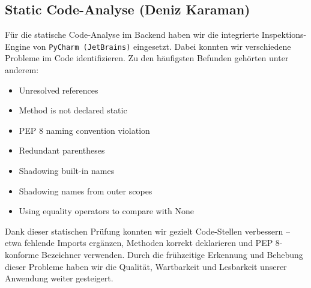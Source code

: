 \documentclass{article}
\begin{document}
\subsection{Static Code-Analyse (Deniz Karaman)}
Für die statische Code‐Analyse im Backend haben wir die integrierte Inspektions-Engine von \texttt{PyCharm (JetBrains)} eingesetzt. Dabei konnten wir verschiedene Probleme im Code identifizieren. Zu den häufigsten Befunden gehörten unter anderem:

\begin{itemize}
  \item Unresolved references
  \item Method is not declared static
  \item PEP 8 naming convention violation 
  \item Redundant parentheses
  \item Shadowing built-in names
  \item Shadowing names from outer scopes
  \item Using equality operators to compare with None
\end{itemize}

Dank dieser statischen Prüfung konnten wir gezielt Code-Stellen verbessern – etwa fehlende Imports ergänzen, Methoden korrekt deklarieren und PEP 8-konforme Bezeichner verwenden. Durch die frühzeitige Erkennung und Behebung dieser Probleme haben wir die Qualität, Wartbarkeit und Lesbarkeit unserer Anwendung weiter gesteigert.

\newpage



\end{document}
